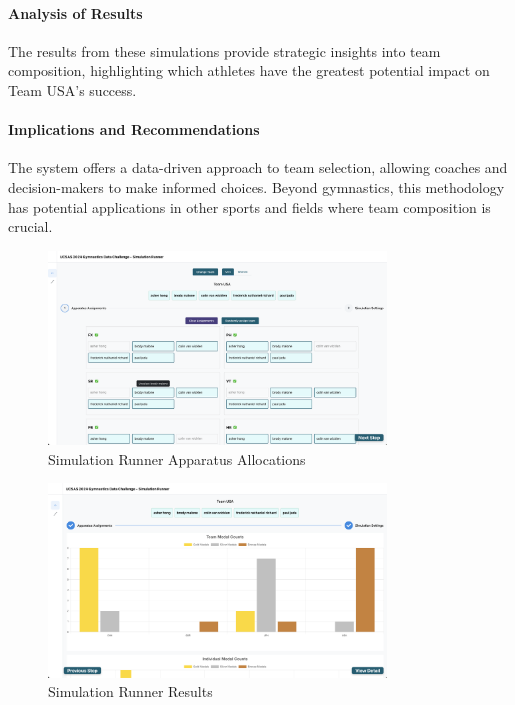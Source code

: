 \documentclass{article}
\begin{document}
\paragraph{Analysis of Results}
The results from these simulations provide strategic insights into team composition, highlighting which athletes have the greatest potential impact on Team USA's success.

\paragraph{Implications and Recommendations}
The system offers a data-driven approach to team selection, allowing coaches and decision-makers to make informed choices. Beyond gymnastics, this methodology has potential applications in other sports and fields where team composition is crucial.

\begin{figure}[H]
    \centering
    \includegraphics[width=0.8\textwidth]{./simulation_runner.png}
    \caption{Simulation Runner Apparatus Allocations}
    \label{fig:sim_runner}
\end{figure}

\begin{figure}[H]
    \centering
    \includegraphics[width=0.8\textwidth]{./results_viewer.png}
    \caption{Simulation Runner Results}
    \label{fig:sim_results}
\end{figure}
\end{document}
